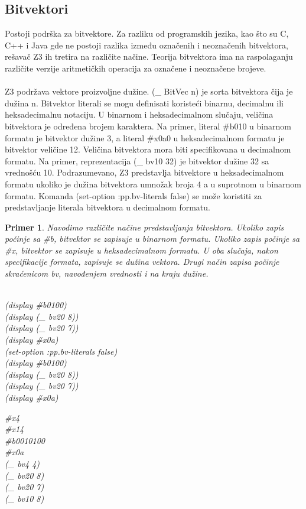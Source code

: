 \documentclass[12pt,oneside]{memoir}
\newtheorem{primer}{Primer}
\begin{document}
\subsection{Bitvektori}
Postoji podrška za bitvektore. Za razliku od programskih jezika, kao što su C, C++ i Java gde ne postoji razlika između označenih i neoznačenih bitvektora, rešavač Z3 ih tretira na različite načine. Teorija bitvektora ima na raspolaganju različite verzije aritmetičkih operacija za označene i neoznačene brojeve.
\\ \\
Z3 podržava vektore proizvoljne dužine. (\_ BitVec n) je sorta bitvektora čija je dužina n. Bitvektor literali se mogu definisati koristeći binarnu, decimalnu ili heksadecimalnu notaciju. U binarnom i heksadecimalnom slučaju, veličina bitvektora je određena brojem karaktera. Na primer, literal \#b010 u binarnom formatu je bitvektor dužine 3, a literal \#x0a0 u heksadecimalnom formatu je bitvektor veličine 12. Veličina bitvektora mora biti specifikovana u decimalnom formatu. Na primer, reprezentacija (\_ bv10 32) je bitvektor dužine 32 sa vrednošću 10. Podrazumevano, Z3 predstavlja bitvektore u heksadecimalnom formatu ukoliko je dužina bitvektora umnožak broja 4 a u suprotnom u binarnom formatu. Komanda 
(set-option :pp.bv-literals false) se može koristiti za predstavljanje literala bitvektora u decimalnom formatu. 
\begin{primer} Navodimo različite načine predstavljanja bitvektora. Ukoliko zapis počinje sa \#b, bitvektor se zapisuje u binarnom formatu. Ukoliko zapis počinje sa \#x, bitvektor se zapisuje u heksadecimalnom formatu. U oba slučaja, nakon specifikacije formata, zapisuje se dužina vektora. Drugi način zapisa počinje skraćenicom bv, navođenjem vrednosti i na kraju dužine. \\\\
\begin{minipage}[b]{0.4\textwidth}
(display \#b0100)
\\(display (\_ bv20 8))
\\(display (\_ bv20 7))
\\(display \#x0a) 
\\(set-option :pp.bv-literals false)
\\(display \#b0100)
\\(display (\_ bv20 8))
\\(display (\_ bv20 7))
\\(display \#x0a)
\end{minipage}
\hspace{1.5cm}
\begin{minipage}[t]{0.4\textwidth}
\vspace{-5.3cm}
\#x4 
\\\#x14 
\\\#b0010100 
\\\#x0a 
\\(\_ bv4 4) 
\\(\_ bv20 8) 
\\(\_ bv20 7) 
\\(\_ bv10 8)
\end{minipage}


\end{primer}
\end{document}
